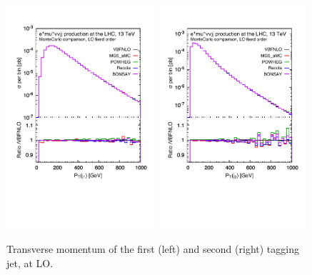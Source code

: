 \documentclass[a4paper,10pt]{report}
\begin{document}
\begin{figure}[h!]
   \centering
   \includegraphics[width=0.49\textwidth,angle=0,clip=true,trim={0.4cm 2.5cm 0.6cm 1.cm}]{figures/ptj1_LO.pdf}
   \includegraphics[width=0.49\textwidth,angle=0,clip=true,trim={0.4cm 2.5cm 0.6cm 1.cm}]{figures/ptj2_LO.pdf}
\caption{\label{fig:ptj1-2LO}Transverse momentum of the first (left) and second (right) tagging jet, at LO.
}
\end{figure}
%
\end{document}
